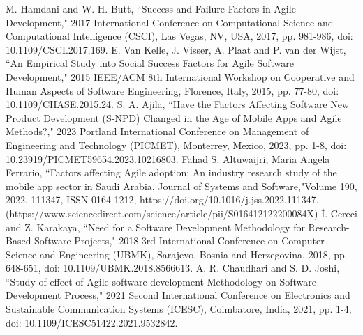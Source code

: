\documentclass[conference]{IEEEtran}
\begin{document}
\begin{thebibliography}{00}
     M. Hamdani and W. H. Butt, ``Success and Failure Factors in Agile Development," 2017 International Conference on Computational Science and Computational Intelligence (CSCI), Las Vegas, NV, USA, 2017, pp. 981-986, doi: 10.1109/CSCI.2017.169.
     E. Van Kelle, J. Visser, A. Plaat and P. van der Wijst, ``An Empirical Study into Social Success Factors for Agile Software Development," 2015 IEEE/ACM 8th International Workshop on Cooperative and Human Aspects of Software Engineering, Florence, Italy, 2015, pp. 77-80, doi: 10.1109/CHASE.2015.24.
     S. A. Ajila, ``Have the Factors Affecting Software New Product Development (S-NPD) Changed in the Age of Mobile Apps and Agile Methods?," 2023 Portland International Conference on Management of Engineering and Technology (PICMET), Monterrey, Mexico, 2023, pp. 1-8, doi: 10.23919/PICMET59654.2023.10216803.
     Fahad S. Altuwaijri, Maria Angela Ferrario, ``Factors affecting Agile adoption: An industry research study of the mobile app sector in Saudi Arabia,
    Journal of Systems and Software,"Volume 190, 2022, 111347, ISSN 0164-1212, https://doi.org/10.1016/j.jss.2022.111347. (https://www.sciencedirect.com/science/article/pii/S016412122200084X)
     İ. Cereci and Z. Karakaya, ``Need for a Software Development Methodology for Research-Based Software Projects," 2018 3rd International Conference on Computer Science and Engineering (UBMK), Sarajevo, Bosnia and Herzegovina, 2018, pp. 648-651, doi: 10.1109/UBMK.2018.8566613.
     A. R. Chaudhari and S. D. Joshi, ``Study of effect of Agile software development Methodology on Software Development Process," 2021 Second International Conference on Electronics and Sustainable Communication Systems (ICESC), Coimbatore, India, 2021, pp. 1-4, doi: 10.1109/ICESC51422.2021.9532842.
    \end{thebibliography}
\end{document}
